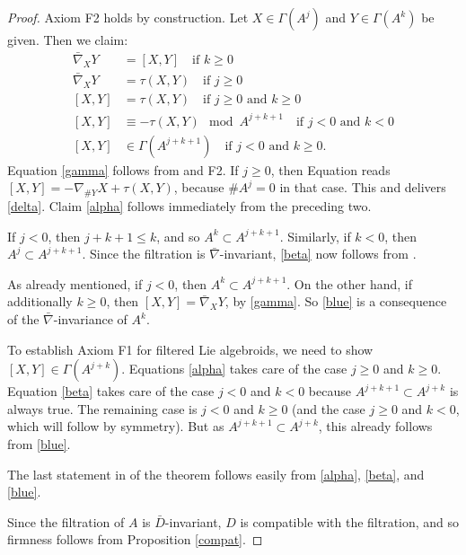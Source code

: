 \documentclass[leqno,12pt]{amsart} %
\begin{document}
\begin{proof}
  Axiom F2 holds by construction. Let $X\in \Gamma(A^j)$ and $Y\in \Gamma(A^k)$ be
  given. Then we claim:
  \begin{align}
  \bar\nabla_X Y &= [X, Y] \quad\text{if $k \ge 0$}\label{gamma}\\
  \bar\nabla_X Y &= \tau(X, Y) \quad\text{if $j \ge 0$}\label{delta}\\
  [X, Y] &= \tau(X, Y) \quad\text{if $j \ge 0$ and $k \ge 0$} \label{alpha}\\
  [X, Y] &\equiv -\tau(X, Y) \mod A^{j + k + 1} \quad\text{if $j < 0$ and $k < 0$}\label{beta}\\
  [X, Y] &\in \Gamma(A^{j + k + 1}) \quad\text{if $j < 0$ and $k \ge 0$}.\label{blue}
  \end{align}
  Equation \eqref{gamma} follows from  and F2. If $j\ge 0$, then
  Equation  reads $[X, Y] = - \nabla_{\#Y}X +\tau(X, Y)$, because
  $\#A^j=0$ in that case. This and  delivers \eqref{delta}.  Claim
  \eqref{alpha} follows immediately from the preceding two.

  If $j < 0$, then $j + k + 1 \le k$, and so
  $A^k \subset A^{j + k+ 1}$. Similarly, if $k < 0$, then
  $A^j \subset A^{j + k + 1}$. Since the filtration is
  $\bar\nabla$-invariant, \eqref{beta} now follows from .

  As already mentioned, if $j <0 $, then $A^k \subset A^{j+k+1}$. On
  the other hand, if additionally $k \ge 0$, then
  $[X, Y] = \bar\nabla_XY$, by \eqref{gamma}. So \eqref{blue} is a
  consequence of the $\bar\nabla $-invariance of $A^k$.

  To establish Axiom F1 for filtered Lie algebroids, we need to show
  $[X, Y] \in \Gamma(A^{j+k})$. Equations \eqref{alpha} takes care of the case $j\ge 0$
  and $k \ge 0$. Equation \eqref{beta} takes care of the case $j < 0$ and $k < 0$ because
  $A^{j+k+1} \subset A^{j+k}$ is always true. The remaining case is $j < 0$ and $k \ge 0$
  (and the case $j \ge 0$ and $k < 0$, which will follow by symmetry). But as
  $A^{j + k + 1} \subset A^{j + k}$, this already follows from \eqref{blue}.

  The last statement in of the theorem follows easily from \eqref{alpha}, \eqref{beta},
  and \eqref{blue}.

  Since the filtration of $A$ is $\bar D$-invariant, $D$ is compatible with the
  filtration, and so firmness follows from Proposition \ref{compat}.
\end{proof}
\end{document}
